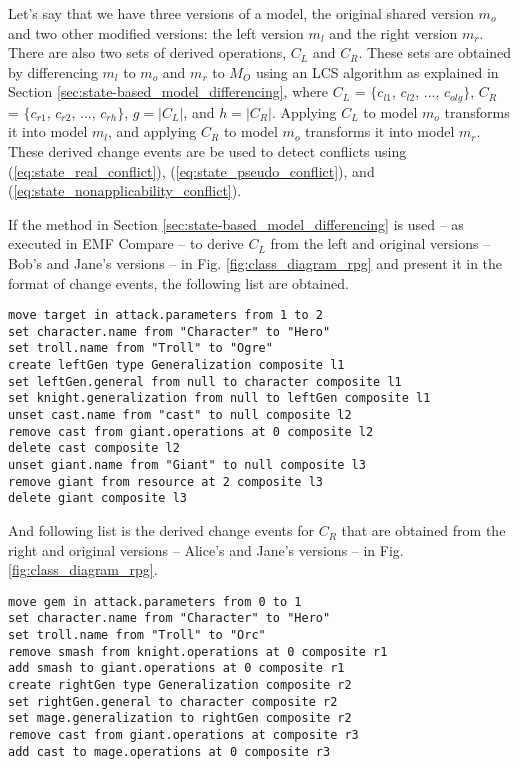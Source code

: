 Let's say that we have three versions of a model, the original shared version $m_{o}$ and two other modified versions: the left version $m_{l}$ and the right version $m_{r}$. There are also two sets of derived operations, $C_{L}$ and $C_{R}$. These sets are obtained by differencing $m_{l}$ to $m_{o}$ and $m_{r}$ to $M_{O}$ using an LCS algorithm as explained in Section \ref{sec:state-based_model_differencing}, where $C_{L}$ = $\{c_{l1}$, $c_{l2}$, ..., $c_{olg}\}$, $C_{R}$ = $\{c_{r1}$, $c_{r2}$, ..., $c_{rh}\}$, $g = |C_{L}|$, and $h = |C_{R}|$. Applying $C_{L}$ to model $m_{o}$ transforms it into model $m_{l}$, and applying $C_{R}$ to model $m_{o}$ transforms it into model $m_{r}$. These derived change events are be used to detect conflicts using (\ref{eq:state_real_conflict}), (\ref{eq:state_pseudo_conflict}), and (\ref{eq:state_nonapplicability_conflict}).  

If the method in Section \ref{sec:state-based_model_differencing} is used -- as executed in EMF Compare -- to derive $C_{L}$ from the left and original versions -- Bob's and Jane's versions -- in Fig. \ref{fig:class_diagram_rpg} and present it in the format of change events, the following list are obtained. 
\begin{lstlisting}[firstnumber=1,style=eol,caption={The derived change events made by Bob to produce the right model in Fig. \ref{fig:class_diagram_left} (right version).},label=lst:cbp_left_state]
move target in attack.parameters from 1 to 2
set character.name from "Character" to "Hero"
set troll.name from "Troll" to "Ogre"
create leftGen type Generalization composite l1
set leftGen.general from null to character composite l1
set knight.generalization from null to leftGen composite l1
unset cast.name from "cast" to null composite l2
remove cast from giant.operations at 0 composite l2
delete cast composite l2
unset giant.name from "Giant" to null composite l3
remove giant from resource at 2 composite l3
delete giant composite l3
\end{lstlisting}

And following list is the derived change events for $C_{R}$ that are obtained from the right and original versions -- Alice's and Jane's versions -- in Fig. \ref{fig:class_diagram_rpg}. 
\begin{lstlisting}[firstnumber=1,style=eol,caption={The derived change events (operations) made by Alice to produce the right model in Fig. \ref{fig:class_diagram_right} (right version).},label=lst:cbp_right_state]
move gem in attack.parameters from 0 to 1
set character.name from "Character" to "Hero"
set troll.name from "Troll" to "Orc"
remove smash from knight.operations at 0 composite r1
add smash to giant.operations at 0 composite r1
create rightGen type Generalization composite r2
set rightGen.general to character composite r2
set mage.generalization to rightGen composite r2
remove cast from giant.operations at composite r3
add cast to mage.operations at 0 composite r3
\end{lstlisting}

